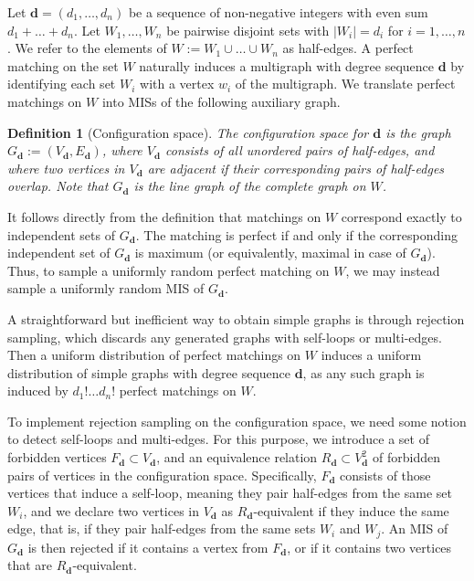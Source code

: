 \documentclass{article}
\theoremstyle{plain}
\theoremstyle{remark}
\theoremstyle{plain}
\newtheorem{definition}[theorem]{Definition}
\numberwithin{equation}{section}
\renewcommand{\d}{{\boldsymbol{d}}}
\begin{document}
	Let $\d=(d_1,\ldots,d_n)$ be a sequence of non-negative integers with even sum $d_1+\ldots+d_n$. Let $W_1,\ldots,W_n$ be pairwise disjoint sets with $|W_i|=d_i$ for $i=1,\ldots,n$. We refer to the elements of $W:=W_1\cup\ldots\cup W_n$ as half-edges. A perfect matching on the set $W$ naturally induces a multigraph with degree sequence $\d$ by identifying each set $ W_i $ with a vertex $w_i$ of the multigraph. We translate perfect matchings on $ W $ into MISs of the following auxiliary graph.
	
	\begin{definition}[Configuration space]\label{definition_space}
		The \emph{configuration space} for $\d$ is the graph $G_\d:=(V_\d,E_\d)$, where $V_\d$ consists of all unordered pairs of half-edges, and where two vertices in $V_\d$ are adjacent if their corresponding pairs of half-edges overlap. Note that $G_{\d}$ is the line graph of the complete graph on $W$.
	\end{definition}
	
	It follows directly from the definition that matchings on $W$ correspond exactly to independent sets of $G_\d$. The matching is perfect if and only if the corresponding independent set of $G_\d$ is maximum (or equivalently, maximal in case of $G_\d$). Thus, to sample a uniformly random perfect matching on $W$, we may instead sample a uniformly random MIS of $G_\d$.
	
	A straightforward but inefficient way to obtain simple graphs is through rejection sampling, which discards any generated graphs with self-loops or multi-edges. Then a uniform distribution of perfect matchings on $W$ induces a uniform distribution of simple graphs with degree sequence $\d$, as any such graph is induced by $d_1!\ldots d_n!$ perfect matchings on $W$.
	
	To implement rejection sampling on the configuration space, we need some notion to detect self-loops and multi-edges. For this purpose, we introduce a set of forbidden vertices $F_\d\subset V_\d$, and an equivalence relation $R_\d\subset V_\d^2$ of forbidden pairs of vertices in the configuration space. Specifically, $F_\d$ consists of those vertices that induce a self-loop, meaning they pair half-edges from the same set $W_i$, and we declare two vertices in $V_\d$ as $R_\d$-equivalent if they induce the same edge, that is, if they pair half-edges from the same sets $W_i$ and $W_j$. An MIS of $G_\d$ is then rejected if it contains a vertex from $F_\d$, or if it contains two vertices that are $R_\d$-equivalent.
	
\end{document}
